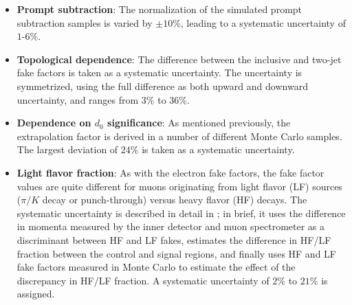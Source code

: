 \begin{itemize}
  \item \textbf{Prompt subtraction}: The normalization of the simulated prompt subtraction samples is varied by $\pm10\%$, leading to a systematic uncertainty of $1$-$6\%$.
  \item \textbf{Topological dependence}: The difference between the inclusive and two-jet fake factors is taken as a systematic uncertainty. The uncertainty is symmetrized, using the full difference as both upward and downward uncertainty, and ranges from $3\%$ to $36\%$. 
  \item \textbf{Dependence on $d_0$ significance}: As mentioned previously, the extrapolation factor is derived in a number of different Monte Carlo samples. The largest deviation of $24\%$ is taken as a systematic uncertainty.
  \item \textbf{Light flavor fraction}: As with the electron fake factors, the fake factor values are quite different for muons originating from light flavor (LF) sources ($\pi/K$ decay or punch-through) versus heavy flavor (HF) decays. The systematic uncertainty is described in detail in \cite{DeViveiros:1670929}; in brief, it uses the difference in momenta measured by the inner detector and muon spectrometer as a discriminant between HF and LF fakes, estimates the difference in HF/LF fraction between the control and signal regions, and finally uses HF and LF fake factors measured in Monte Carlo to estimate the effect of the discrepancy in HF/LF fraction. A systematic uncertainty of $2\%$ to $21\%$ is assigned. 
\end{itemize}

